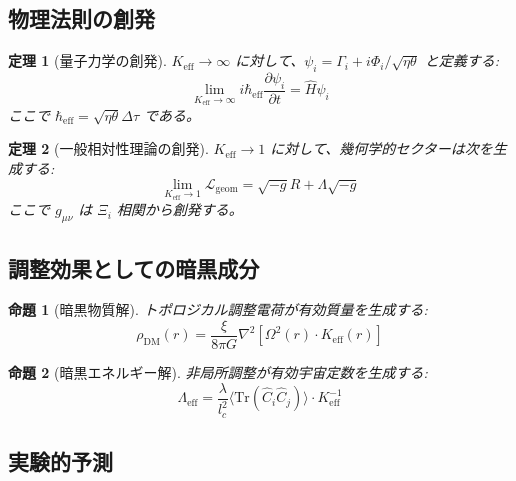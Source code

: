 \documentclass[11pt,a4paper]{article}
\newtheorem{theorem}{定理}
\newtheorem{proposition}{命題}
\begin{document}
	\subsection{物理法則の創発}
	
	\begin{theorem}[量子力学の創発]
		$K_{\mathrm{eff}} \to \infty$ に対して、$\psi_i = \Gamma_i + i\Phi_i/\sqrt{\eta\theta}$ と定義する:
		\[
		\lim_{K_{\mathrm{eff}} \to \infty} i\hbar_{\mathrm{eff}}\frac{\partial\psi_i}{\partial t} = \hat{H}\psi_i
		\]
		ここで $\hbar_{\mathrm{eff}} = \sqrt{\eta\theta}\Delta\tau$ である。
	\end{theorem}
	
	\begin{theorem}[一般相対性理論の創発]
		$K_{\mathrm{eff}} \to 1$ に対して、幾何学的セクターは次を生成する:
		\[
		\lim_{K_{\mathrm{eff}} \to 1} \mathcal{L}_{\mathrm{geom}} = \sqrt{-g}R + \Lambda\sqrt{-g}
		\]
		ここで $g_{\mu\nu}$ は $\Xi_i$ 相関から創発する。
	\end{theorem}
	
	\subsection{調整効果としての暗黒成分}
	
	\begin{proposition}[暗黒物質解]
		トポロジカル調整電荷が有効質量を生成する:
		\[
		\rho_{\mathrm{DM}}(r) = \frac{\xi}{8\pi G} \nabla^2 \left[ \Omega^2(r) \cdot K_{\mathrm{eff}}(r) \right]
		\]
	\end{proposition}
	
	\begin{proposition}[暗黒エネルギー解]
		非局所調整が有効宇宙定数を生成する:
		\[
		\Lambda_{\mathrm{eff}} = \frac{\lambda}{l_c^2} \langle \mathrm{Tr}(\hat{C}_i\hat{C}_j) \rangle \cdot K_{\mathrm{eff}}^{-1}
		\]
	\end{proposition}
	
	\subsection{実験的予測}
	
\end{document}
